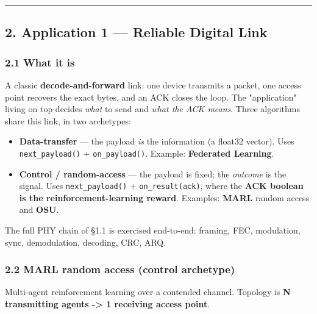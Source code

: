 \documentclass[
  10pt,
]{article}
\providecommand{\tightlist}{%
  \setlength{\itemsep}{0pt}\setlength{\parskip}{0pt}}
\begin{document}
\begin{center}\rule{0.5\linewidth}{0.5pt}\end{center}

\hypertarget{2-application-1--reliable-digital-link}{%
\subsection{2. Application 1 --- Reliable Digital
Link}\label{2-application-1--reliable-digital-link}}

\hypertarget{21-what-it-is}{%
\subsubsection{2.1 What it is}\label{21-what-it-is}}

A classic \textbf{decode-and-forward} link: one device transmits a
packet, one access point recovers the exact bytes, and an ACK closes the
loop. The "application" living on top decides \emph{what} to send and
\emph{what the ACK means}. Three algorithms share this link, in two
archetypes:

\begin{itemize}
\tightlist
\item
  \textbf{Data-transfer} --- the payload \emph{is} the information (a
  float32 vector). Uses \texttt{next\_payload()} +
  \texttt{on\_payload()}. Example: \textbf{Federated Learning}.
\item
  \textbf{Control / random-access} --- the payload is fixed; the
  \emph{outcome} is the signal. Uses \texttt{next\_payload()} +
  \texttt{on\_result(ack)}, where the \textbf{ACK boolean is the
  reinforcement-learning reward}. Examples: \textbf{MARL} random access
  and \textbf{OSU}.
\end{itemize}

The full PHY chain of §1.1 is exercised end-to-end: framing, FEC,
modulation, sync, demodulation, decoding, CRC, ARQ.

\hypertarget{22-marl-random-access-control-archetype}{%
\subsubsection{2.2 MARL random access (control
archetype)}\label{22-marl-random-access-control-archetype}}

Multi-agent reinforcement learning over a contended channel. Topology is
\textbf{N transmitting agents -\textgreater{} 1 receiving access point}.
\end{document}
